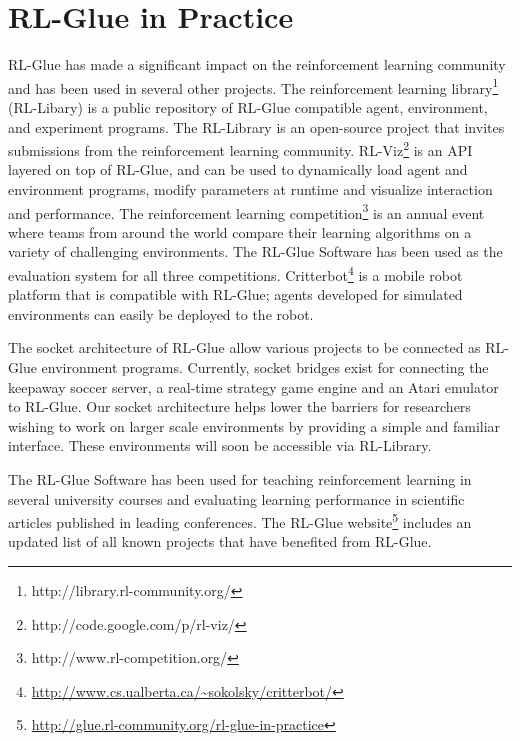 \documentclass[twoside,11pt]{article}
\begin{document}
\section{RL-Glue in Practice}
RL-Glue has made a significant impact on the reinforcement learning community and has been used in several other projects. The reinforcement learning library\footnote{http://library.rl-community.org/} (RL-Libary) is a public repository of RL-Glue compatible agent, environment, and experiment programs.  The RL-Library is an open-source project that invites submissions from the reinforcement learning community.
 RL-Viz\footnote{http://code.google.com/p/rl-viz/} is an API layered on top of  RL-Glue, and can be used to dynamically load agent and environment programs, modify parameters at runtime and visualize interaction and performance.  The reinforcement learning competition\footnote{http://www.rl-competition.org/} is an annual event where teams from around the world compare their learning algorithms on a variety of challenging environments. The RL-Glue Software has been used as the evaluation system for all three competitions. Critterbot\footnote{\url{http://www.cs.ualberta.ca/~sokolsky/critterbot/}} is a mobile robot platform that is compatible with RL-Glue; agents developed for simulated environments can easily be deployed to the robot.

The socket architecture of RL-Glue allow various projects to be connected as RL-Glue environment programs. Currently, socket bridges exist for connecting the keepaway soccer server, a real-time strategy game engine and an Atari emulator to RL-Glue. Our socket architecture helps lower the barriers for researchers wishing to work on larger scale environments by providing a simple and familiar interface. These environments will soon be accessible via RL-Library. 

The RL-Glue Software has been used for teaching reinforcement learning in several university courses and evaluating learning performance in scientific articles published in leading conferences. The RL-Glue website\footnote{\url{http://glue.rl-community.org/rl-glue-in-practice}} includes an updated list of all known projects that have benefited from RL-Glue.
\end{document}
